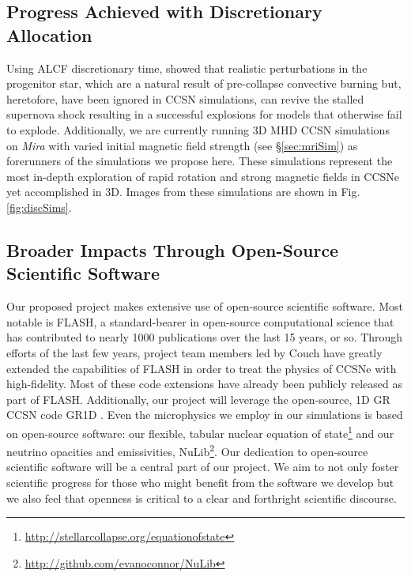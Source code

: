 \subsection{Progress Achieved with Discretionary Allocation}
\label{sec:discretionary}

Using ALCF discretionary time, \citet{Couch:2013bl} showed that realistic perturbations in the progenitor star, which are a natural result of pre-collapse convective burning but, heretofore, have been ignored in CCSN simulations, can revive the stalled supernova shock resulting in a successful explosions for models that otherwise fail to explode. 
Additionally, we are currently running 3D MHD CCSN simulations on {\it Mira} with varied initial magnetic field strength (see \S\ref{sec:mriSim}) as forerunners of the simulations we propose here.
These simulations represent the most in-depth exploration of rapid rotation and strong magnetic fields in CCSNe yet accomplished in 3D.
Images from these simulations are shown in Fig. \ref{fig:discSims}.

\subsection{Broader Impacts Through Open-Source Scientific Software}

Our proposed project makes extensive use of open-source scientific software.
Most notable is FLASH, a standard-bearer in open-source computational science that has contributed to nearly 1000 publications over the last 15 years, or so.
Through efforts of the last few years, project team members led by Couch have greatly extended the capabilities of FLASH in order to treat the physics of CCSNe with high-fidelity.
Most of these code extensions have already been publicly released as part of FLASH.
Additionally, our project will leverage the open-source, 1D GR CCSN code GR1D \citep{OConnor:2010bi}.
Even the microphysics we employ in our simulations is based on open-source software: our flexible, tabular nuclear equation of state\footnote{\url{http://stellarcollapse.org/equationofstate}} and our neutrino opacities and emissivities, NuLib\footnote{\url{http://github.com/evanoconnor/NuLib}}.
Our dedication to open-source scientific software will be a central part of our project. 
We aim to not only foster scientific progress for those who might benefit from the software we develop but we also feel that openness is critical to a clear and forthright scientific discourse.
